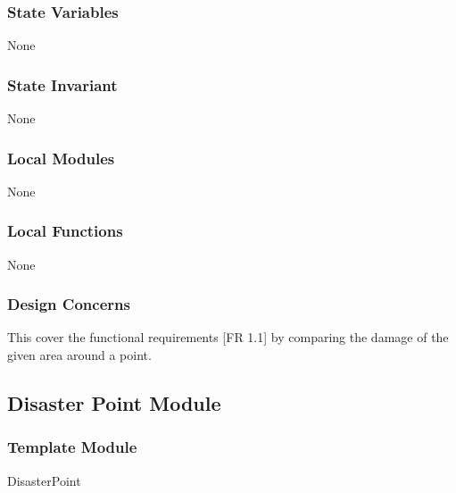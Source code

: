 \documentclass[12pt]{article}
\begin{document}
                \subsubsection* {State Variables}

                None
                
                \subsubsection* {State Invariant}

                None
                
                \subsubsection* {Local Modules}
                
                None
                
                \subsubsection* {Local Functions}
                
                None

                \subsubsection* {Design Concerns}

                This cover the functional requirements [FR 1.1] by comparing the damage of the given area around a point.
        
                \newpage
                \subsection* {Disaster Point Module}
                
                \subsubsection*{Template Module}
                
                DisasterPoint
                
\end{document}
